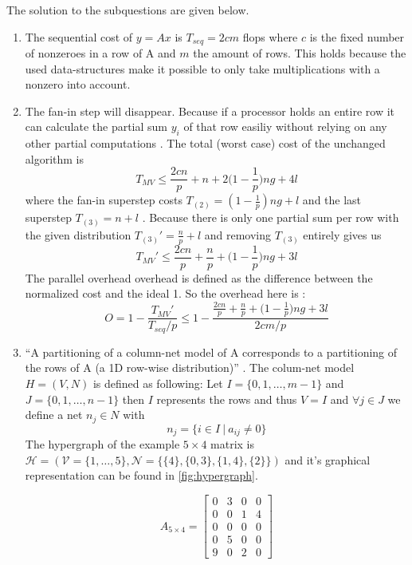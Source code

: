 \documentclass[../main.tex]{subfiles}
\begin{document}
\begin{solution} The solution to the subquestions are given below.
\begin{enumerate}
	\item The sequential cost of $y=Ax$ is $T_{seq} = 2cm$ flops \cite[p.~166]{bisseling04} where $c$ is the fixed number of nonzeroes in a row of A and $m$ the amount of rows. This holds because the used data-structures make it possible to only take multiplications with a nonzero into account.
	\item The fan-in step will disappear. Because if a processor holds an entire row it can calculate the partial sum $y_i$ of that row easiliy without relying on any other partial computations \cite[p.~176]{bisseling04}.  The total (worst case) cost of the unchanged algorithm is
	\begin{equation}
		T_{MV} \leq \frac{2cn}{p} + n + 2 \Big( 1 - \frac{1}{p} \Big) ng + 4l
	\end{equation}
			where the fan-in superstep costs $T_{(2)} = (1-\frac{1}{p})ng + l$ and the last superstep $T_{(3)} = n + l $ \cite[p.~178]{bisseling04}. Because there is only one partial sum per row with the given distribution $T_{(3)}' = \frac{n}{p} + l $ and removing $T_{(3)}$ entirely gives us
			\begin{equation}
				T_{MV}' \leq \frac{2cn}{p} + \frac{n}{p} + \Big(1 - \frac{1}{p} \Big) ng + 3l
			\end{equation}
			The parallel overhead overhead is defined as the difference between the normalized cost and the ideal 1. So the overhead here is \cite[p.~141]{bisseling04}:
			\begin{equation}
				O = 1 - \frac{T_{MV}'}{T_{seq}/p} \leq 1 - \frac{\frac{2cn}{p} + \frac{n}{p} + \Big(1 - \frac{1}{p} \Big) ng + 3l}{2cm/p}
			\end{equation}
	\item ``A partitioning of a column-net model of A corresponds to a partitioning of the rows of A (a 1D row-wise distribution)'' \cite{slides6}. The colum-net model $H=(V,N)$ is defined as following: Let $I = \{0,1,\ldots,m-1\}$ and $J = \{0,1,\ldots,n-1\}$ then $I$ represents the rows and thus $V = I$ and $\forall j \in J$ we define a net $n_j \in N$ with
	$$ n_j = \{i \in I ~|~ a_{ij} \neq 0\} $$
	The hypergraph of the example $5 \times 4$ matrix is $\mathcal{H}=(\mathcal{V} =\{1,\ldots,5\},\mathcal{N} = \{\{4\},\{0, 3\},\{1,4\},\{2\}\})$ and it's graphical representation can be found in \autoref{fig:hypergraph}.

	\begin{equation}
		A_{5\times4} = \begin{bmatrix}
		0 & 3 & 0 & 0 \\
		0 & 0 & 1 & 4 \\
		0 & 0 & 0 & 0 \\
		0 & 5 & 0 & 0 \\
		9 & 0 & 2 & 0
		\end{bmatrix}
	\end{equation}


\end{enumerate}
\end{solution}
\end{document}
